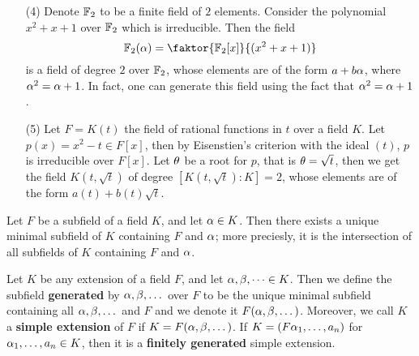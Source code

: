 \begin{example}
\begin{enumerate}
    \item[(4)] Denote $\mathbb{F}_2$ to be a finite field of $2$ elements. Consider
      the polynomial  $x^2+x+1$ over  $\mathbb{F}_2$ which is irreducible. Then
      the field
      \begin{equation*}
        \F_2(\a)=\faktor{\F_2[x]}{(x^2+x+1)}
      \end{equation*}
      is a field of degree $2$ over  $\mathbb{F}_2$, whose elements are of the
      form $a+b\alpha$, where  $\alpha^2=\alpha+1$. In fact, one can generate this
      field using the fact that  $\alpha^2=\alpha+1$.

    \item[(5)] Let $F=K(t)$ the field of rational functions in $t$ over a field
      $K$. Let $p(x)=x^2-t \in F[x]$, then by Eisenstien's criterion with
      the ideal $(t)$, $p$ is irreducible over  $F[x]$. Let $\theta$ be a
      root for  $p$, that is  $\theta=\sqrt{t}$, then we get the field
      $K(t,\sqrt{t})$ of degree $[K(t,\sqrt{t}) : K]=2$, whose elements are
      of the form $a(t)+b(t)\sqrt{t}$.
  \end{enumerate}
\end{example}

\begin{lemma}\label{lemma_8.1.7}
  Let $F$ be a subfield of a field $K$, and let  $\alpha \in K$. Then there exists
  a unique minimal subfield of  $K$ containing  $F$ and  $\alpha$; more preciesly,
  it is the intersection of all subfields of  $K$ containing $F$ and $\alpha$.
\end{lemma}

\begin{definition}
  Let $K$ be any extension of a field $F$, and let  $\alpha, \beta, \dots \in K$.
  Then we define the subfield \textbf{generated} by $\alpha, \beta, \dots$
  over  $F$ to be the unique minimal subfield containing all $\alpha,\beta, \dots$
  and $F$ and we denote it  $F(\alpha, \beta, \dots)$. Moreover, we call $K$ a
  \textbf{simple extension} of $F$ if  $K=F(\alpha, \beta, \dots)$. If $K=(F\alpha_1,
  \dots, a_n)$ for $\alpha_1, \dots, a_n \in K$, then it is a \textbf{finitely
  generated} simple extension.
\end{definition}

